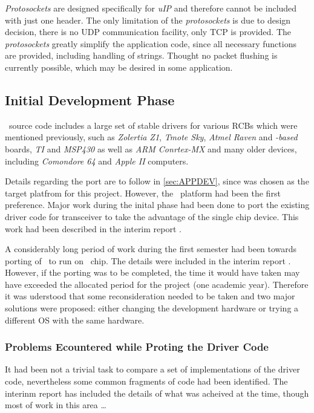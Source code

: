   \emph{Protosockets} are designed specifically for \emph{uIP} and therefore 
 cannot be included with just one header. The only limitation of the
 \emph{protosockets} is due to design decision, there is no UDP communication
 facility, only TCP is provided. The \emph{protosockets} greatly simplify the
 application code, since all necessary functions are provided, including
 handling of strings. Thought no packet flushing is currently possible, which
 may be desired in some application.

\subsection{Initial Development Phase}

  \Contiki\ source code includes a large set of stable drivers for various
 RCBs which were mentioned previously, such as \emph{Zolertia Z1}, \emph{Tmote
 Sky}, \emph{Atmel Raven} and \emph{-based} boards, \emph{TI}
  and \emph{MSP430} as well as \emph{ARM Conrtex-MX} and many
 older devices, including \emph{Comondore 64} and \emph{Apple II} computers.

 Details regarding the  port \cite{links:contiki:port:mc1322x}
 are to follow in \ref{sec:APPDEV}, since  was chosen as the
 target platfrom for this project. However, the \RFA\ platform had been the
 first preference. Major work during the inital phase had been done to
 port the existing driver code for  transceiver to take the
 advantage of the single chip device. This work had been described in the
 interim report \cite{wmi:irep}.


  A considerably long period of work during the first semester had been
 towards porting of \ContikiOS\ to run on \RFA\ chip. The details were
 included in the interim report \cite{docs:irep}. However, if the porting
 was to be completed, the time it would have taken may have exceeded the
 allocated period for the project (one academic year). Therefore it was
 uderstood that some reconsideration needed to be taken and two major
 solutions were proposed: either changing the development hardware or
 trying a different OS with the same hardware.

\subsubsection{Problems Ecountered while Proting the Driver Code}

  It had been not a trivial task to compare a set of implementations
 of the driver code, nevertheless some common fragments of code had
 been identified. The interinm report has included the details of what
 was acheived at the time, though most of work in this area \dots
